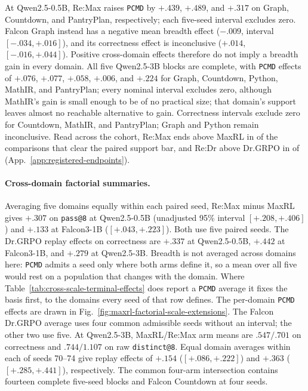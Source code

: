 \documentclass{article}
\newcommand{\1}{\mathbf 1}
\newcommand{\pmd}{\texttt{PCMD}}
\theoremstyle{remark}
\theoremstyle{definition}
\theoremstyle{plain}
\begin{document}
At Qwen2.5-0.5B, Re:Max raises \pmd{} by $+.439$, $+.489$, and $+.317$ on
Graph, Countdown, and PantryPlan, respectively; each five-seed interval excludes
zero. Falcon Graph instead has a negative mean breadth effect ($-.009$, interval
$[-.034,+.016]$), and its correctness effect is inconclusive ($+.014$,
$[-.016,+.044]$). Positive cross-domain effects therefore do not imply a breadth
gain in every domain. All five Qwen2.5-3B blocks are complete, with \pmd{}
effects of $+.076$, $+.077$, $+.058$, $+.006$, and $+.224$ for Graph, Countdown,
Python, MathIR, and PantryPlan; every nominal interval excludes zero, although
MathIR's gain is small enough to be of no practical size; that domain's
support leaves almost no reachable alternative to gain. Correctness intervals
exclude zero for Countdown, MathIR, and PantryPlan; Graph and Python remain
inconclusive. Read across the cohort, Re:Max ends above MaxRL in
\PMDaboveReMax{} of the \PMDblocksReMax{} comparisons that clear the paired
support bar, and Re:Dr above Dr.GRPO in \PMDaboveReDr{} of
\PMDblocksReDr{} (App.~\ref{app:registered-endpoints}).

\paragraph{Cross-domain factorial summaries.}
\label{app:factorial-numerical-detail}
Averaging five domains equally within each paired seed, Re:Max minus MaxRL
gives $+.307$ on \texttt{pass@8} at Qwen2.5-0.5B (unadjusted 95\% interval
$[+.208,+.406]$) and $+.133$ at Falcon3-1B ($[+.043,+.223]$). Both use five
paired seeds. The Dr.GRPO replay effects on correctness are $+.337$ at
Qwen2.5-0.5B, $+.442$ at Falcon3-1B, and $+.279$ at Qwen2.5-3B. Breadth is not averaged across domains here: \pmd{} admits a seed only where
both arms define it, so a mean over all five would rest on a population that
changes with the domain. Where
Table~\ref{tab:cross-scale-terminal-effects} does report a \pmd{} average it
fixes the basis first, to the domains every seed of that row defines. The
per-domain \pmd{} effects are drawn in
Fig.~\ref{fig:maxrl-factorial-scale-extensions}. The Falcon Dr.GRPO average uses four common admissible seeds
without an interval; the other two use five. At Qwen2.5-3B, MaxRL/Re:Max arm
means are $.547/.701$ on correctness and $.744/1.107$ on raw
\texttt{distinct@8}. Equal domain averages within each of seeds 70--74 give
replay effects of $+.154$ ($[+.086,+.222]$) and $+.363$ ($[+.285,+.441]$),
respectively. The common four-arm intersection contains fourteen complete
five-seed blocks and Falcon Countdown at four seeds.
\end{document}
